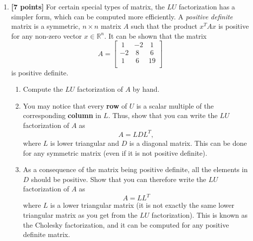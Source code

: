 \documentclass{article}
\begin{document}
\begin{enumerate}
\item {\bf [7 points]} For certain special types of matrix, the $LU$ factorization has a simpler form, which can be computed more efficiently. A {\em positive definite} matrix is a symmetric, $n\times n$ matrix $A$ such that the product $x^TAx$ is positive for any non-zero vector $x \in \mathbb{R}^n$. It can be shown that the matrix
\begin{equation*}
A = \begin{bmatrix}
     ~1    &-2     &~1 \\
    -2     &~8     &~6 \\
     ~1     &~6    &19 \\
\end{bmatrix}
\end{equation*}
is positive definite.
\begin{enumerate}
\item Compute the $LU$ factorization of $A$ by hand.
\item You may notice that every {\bf row} of $U$ is a scalar multiple of the corresponding {\bf column} in $L$. Thus, show that you can write the $LU$ factorization of $A$ as
\begin{equation*}
A = L D L^T,
\end{equation*}
where $L$ is lower triangular and $D$ is a diagonal matrix. This can be done for any symmetric matrix (even if it is not positive definite).
\item As a consequence of the matrix being positive definite, all the elements in $D$ should be positive. Show that you can therefore write the $LU$ factorization of $A$ as
\begin{equation*}
A = LL^T
\end{equation*}
where $L$ is a lower triangular matrix (it is not exactly the same lower triangular matrix as you get from the $LU$ factorization). This is known as the Cholesky factorization, and it can be computed for any positive definite matrix.
\end{enumerate}

\end{enumerate}
\end{document}
